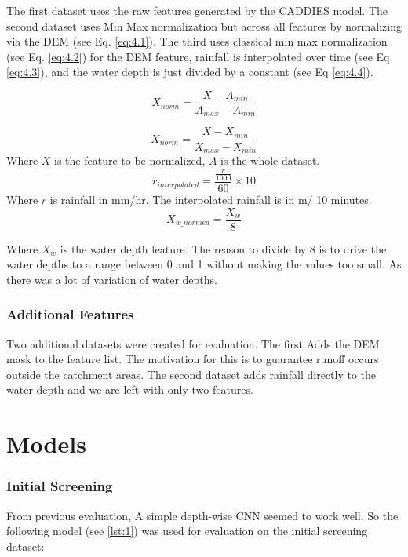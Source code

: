 The first dataset uses the raw features generated by the CADDIES model. The second dataset uses Min Max normalization but across all features by normalizing via the DEM (see Eq. \ref{eq:4.1}). The third uses classical min max normalization (see Eq. \ref{eq:4.2}) for the DEM feature, rainfall is interpolated over time (see Eq \ref{eq:4.3}), and the water depth is just divided by a constant  (see Eq \ref{eq:4.4}).

\begin{equation}
	\label{eq:4.1}
	X_{norm} = \frac{X-A_{min}}{A_{max}-A_{min}}
\end{equation}

\begin{equation}
	\label{eq:4.2}
	X_{norm} = \frac{X-X_{min}}{X_{max}-X_{min}}
\end{equation}
Where $X$ is the feature to be normalized, $A$ is the whole dataset.
\begin{equation}
	\label{eq:4.3}
	r_{interpolated} = \frac{\frac{r}{1000}}{60} \times 10
\end{equation}
Where $r$ is rainfall in mm/hr. The interpolated rainfall is in m/ 10 minutes.
\begin{equation}
	\label{eq:4.4}
	X_{w \_ normed} = \frac{X_{w}}{8}  
\end{equation}

Where $X_{w}$ is the water depth feature. The reason to divide by 8 is to drive the water depths to a range between 0 and 1 without making the values too small. As there was a lot of variation of water depths.

\subsubsection*{Additional Features}
Two additional datasets were created for evaluation. The first Adds the DEM mask to the feature list. The motivation for this is to guarantee  runoff occurs outside the catchment areas. The second dataset adds rainfall directly to the water depth and we are left with only two features.

\section{Models}

\subsubsection*{Initial Screening}
\label{DepthwiseCNN:init}
From previous evaluation, A simple depth-wise CNN seemed to work well.  So the following model (see \ref{lst:1}) was used for evaluation on the initial screening dataset:

